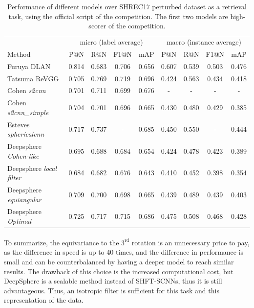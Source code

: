 \documentclass[11pt]{report}
\begin{document}
\begin{table}[ht]
    \centering
    \begin{tabular}{l|c c c c|c c c c}
     & \multicolumn{4}{c|}{micro (label average)} & \multicolumn{4}{c}{macro (instance average)} \\
    Method & P@N & R@N & F1@N & mAP & P@N & R@N & F1@N & mAP \\ \hline
    Furuya DLAN & 0.814 & 0.683 & 0.706 & 0.656 & 0.607 & 0.539 & 0.503 & 0.476 \\
    Tatsuma ReVGG & 0.705 & 0.769 & 0.719 & 0.696 & 0.424 & 0.563 & 0.434 & 0.418\\ \hline
    Cohen \emph{s2cnn} & 0.701 & 0.711 & 0.699 & 0.676 & - & - & - & - \\
    Cohen \emph{s2cnn\_simple} & 0.704 & 0.701 & 0.696 & 0.665 & 0.430 & 0.480 & 0.429 & 0.385\\
    Esteves \emph{sphericalcnn} & 0.717 & 0.737 & - & 0.685 & 0.450 & 0.550 & - & 0.444\\ \hline
    Deepsphere \emph{Cohen-like} & 0.695 & 0.688 & 0.684 & 0.654 & 0.424 & 0.478 & 0.423 & 0.389\\
    Deepsphere \emph{local filter} & 0.684 & 0.682 & 0.676 & 0.643 & 0.410 & 0.452 & 0.398 & 0.354 \\
    Deepsphere \emph{equiangular} & 0.709 & 0.700 & 0.698 & 0.665 & 0.439 & 0.489 & 0.439 & 0.403 \\
    Deepsphere \emph{Optimal} & 0.725 & 0.717 & 0.715 & 0.686 & 0.475 & 0.508 & 0.468 & 0.428
    \end{tabular}
    \caption{Performance of different models over SHREC17 perturbed dataset as a retrieval task, using the official script of the competition. The first two models are high-scorer of the competition.}
    \label{tab:SHREC17_retriev}
\end{table}

\paragraph*{}
To summarize, the equivariance to the $3^{\textrm{rd}}$ rotation is an unnecessary price to pay, as the difference in speed is up to 40 times, and the difference in performance is small and can be counterbalanced by having a deeper model to reach similar results. The drawback of this choice is the increased computational cost, but DeepSphere is a scalable method instead of SHFT-SCNNs, thus it is still advantageous. Thus, an isotropic filter is sufficient for this task and this representation of the data.
\end{document}
